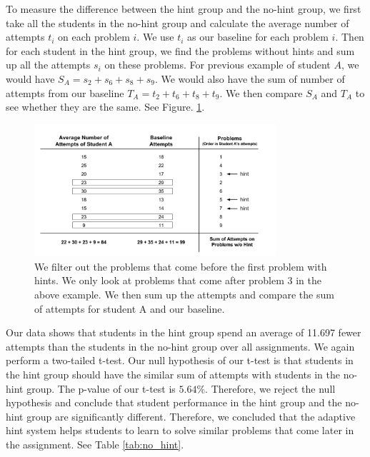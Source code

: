 \documentclass{article} %
\begin{document}
To measure the difference between the hint group and the no-hint group, we first take all the students in the no-hint group and calculate the average number of attempts $t_i$ on each problem $i$. We use $t_i$ as our baseline for each problem $i$. Then for each student in the hint group, we find the problems without hints and sum up all the attempts $s_i$ on these problems. For previous example of student $A$, we would have $S_A = s_2 + s_6 + s_8 + s_9$. We would also have the sum of number of attempts from our baseline $T_A = t_2 + t_6 + t_8 + t_9$. We then compare $S_A$ and $T_A$ to see whether they are the same. See Figure. \ref{fig:pro_no_hint}.

\begin{figure}[ht]
   \centering
   \includegraphics[width=0.8\textwidth]{image/Filter_problems.png}
   \caption{We filter out the problems that come before the first problem with hints. We only look at problems that come after problem 3 in the above example. We then sum up the attempts and compare the sum of attempts for student A and our baseline.}
   \label{fig:pro_no_hint}
\end{figure}

Our data shows that students in the hint group spend an average of 11.697 fewer attempts than the students in the no-hint group over all assignments. We again perform a two-tailed t-test. Our null hypothesis of our t-test is that students in the hint group should have the similar sum of attempts with students in the no-hint group. The p-value of our t-test is $5.64\%$. Therefore, we reject the null hypothesis and conclude that student performance in the hint group and the no-hint group are significantly different. Therefore, we concluded that the adaptive hint system helps students to learn to solve similar problems that come later in the assignment. See Table \ref{tab:no_hint}.
\end{document}
